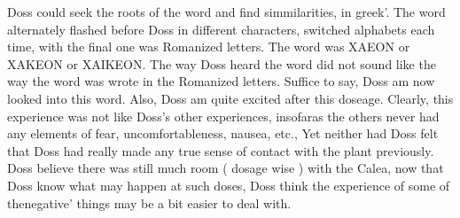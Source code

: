 \documentclass[12pt]{book}
\begin{document}
Doss could seek the roots of the word and find simmilarities, in greek'. The word alternately flashed before Doss in different characters, switched alphabets each time, with the final one was Romanized letters. The word was XAEON or XAKEON or XAIKEON. The way Doss heard the word did not sound like the way the word was wrote in the Romanized letters. Suffice to say, Doss am now looked into this word. Also, Doss am quite excited after this doseage. Clearly, this experience was not like Doss's other experiences, insofaras the others never had any elements of fear, uncomfortableness, nausea, etc., Yet neither had Doss felt that Doss had really made any true sense of contact with the plant previously. Doss believe there was still much room ( dosage wise ) with the Calea, now that Doss know what may happen at such doses, Doss think the experience of some of thenegative' things may be a bit easier to deal with.
\end{document}
